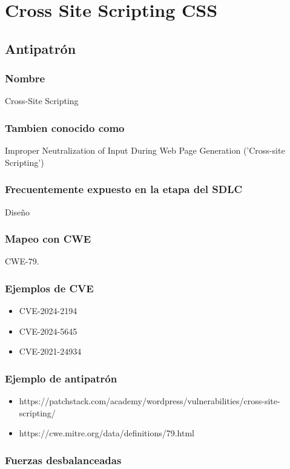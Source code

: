 \chapter{Cross Site Scripting CSS}

\section{Antipatrón}

\subsection*{Nombre}
Cross-Site Scripting
\subsection*{Tambien conocido como}
Improper Neutralization of Input During Web Page Generation ('Cross-site Scripting')
\subsection*{Frecuentemente expuesto en la etapa del SDLC}
Diseño
\subsection*{Mapeo con CWE}
CWE-79. 
\subsection*{Ejemplos de CVE}
\begin{itemize}
    \item CVE-2024-2194
    \item CVE-2024-5645
    \item CVE-2021-24934
\end{itemize}

\subsection*{Ejemplo de antipatrón}

\begin{itemize}
    \item https://patchstack.com/academy/wordpress/vulnerabilities/cross-site-scripting/
    \item https://cwe.mitre.org/data/definitions/79.html
\end{itemize}

\subsection*{Fuerzas desbalanceadas}

